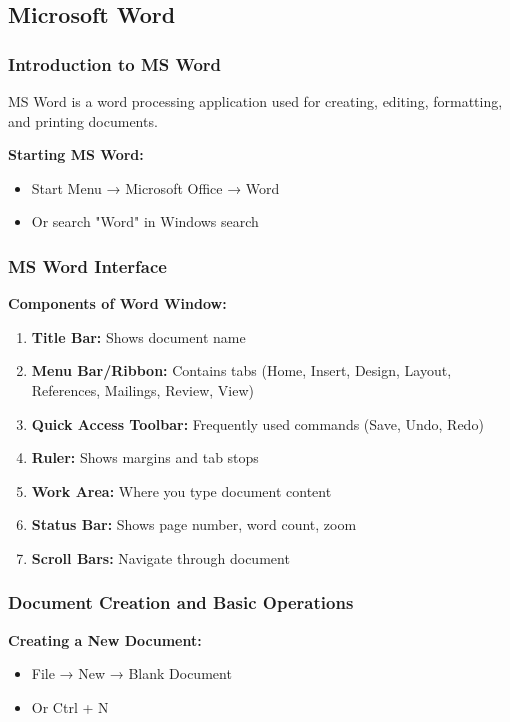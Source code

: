 \documentclass[12pt,a4paper]{article}
\begin{document}
\subsection{Microsoft Word}

\subsubsection{Introduction to MS Word}
MS Word is a word processing application used for creating, editing, formatting, and printing documents.

\textbf{Starting MS Word:}
\begin{itemize}
    \item Start Menu → Microsoft Office → Word
    \item Or search "Word" in Windows search
\end{itemize}

\subsubsection{MS Word Interface}

\textbf{Components of Word Window:}
\begin{enumerate}
    \item \textbf{Title Bar:} Shows document name
    \item \textbf{Menu Bar/Ribbon:} Contains tabs (Home, Insert, Design, Layout, References, Mailings, Review, View)
    \item \textbf{Quick Access Toolbar:} Frequently used commands (Save, Undo, Redo)
    \item \textbf{Ruler:} Shows margins and tab stops
    \item \textbf{Work Area:} Where you type document content
    \item \textbf{Status Bar:} Shows page number, word count, zoom
    \item \textbf{Scroll Bars:} Navigate through document
\end{enumerate}

\subsubsection{Document Creation and Basic Operations}

\textbf{Creating a New Document:}
\begin{itemize}
    \item File → New → Blank Document
    \item Or Ctrl + N
\end{itemize}
\end{document}
